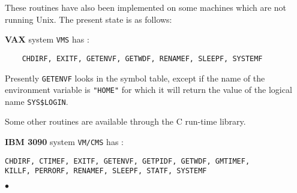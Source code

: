 These routines have also been implemented on some machines
which are not running Unix.
The present state is as follows:
 
{\bf VAX} system {\tt VMS} has :
\begin{verbatim}
    CHDIRF, EXITF, GETENVF, GETWDF, RENAMEF, SLEEPF, SYSTEMF
\end{verbatim}
Presently {\tt GETENVF} looks in the symbol table,
except if the name of the environment variable is {\tt "HOME"}
for which it will return the value of the logical name
\verb'SYS$LOGIN'.
 
Some other routines are available through the C run-time library.
 
{\bf IBM 3090} system {\tt VM/CMS} has :
\begin{verbatim}
CHDIRF, CTIMEF, EXITF, GETENVF, GETPIDF, GETWDF, GMTIMEF,
KILLF, PERRORF, RENAMEF, SLEEPF, STATF, SYSTEMF
\end{verbatim}
$\bullet$
